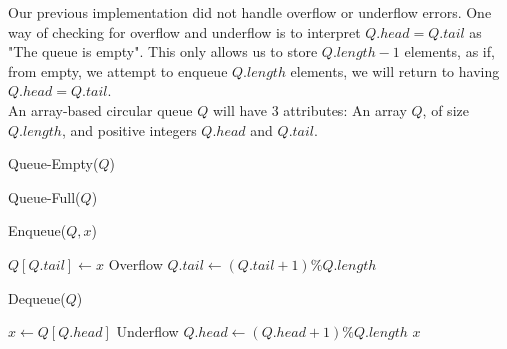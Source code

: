 \documentclass[11pt]{report}
\begin{document}
\begin{impl}
\begin{figure}[H]
    \end{figure}
\end{impl}
\pagebreak
\begin{impl}
    Our previous implementation did not handle overflow or underflow errors. One way of checking for overflow and underflow is to interpret $Q.head = Q.tail$ as "The queue is empty". This only allows us to store $Q.length - 1$ elements, as if, from empty, we attempt to enqueue $Q.length$ elements, we will return to having $Q.head = Q.tail$. \\ An array-based circular queue $Q$ will have 3 attributes: An array $Q$, of size $Q.length$, and positive integers $Q.head$ and $Q.tail$.\mypar
    \begin{algorithm}[H]
        \caption{Queue-Empty($Q$)}
    \end{algorithm}
    \begin{algorithm}[H]
        \caption{Queue-Full($Q$)}
    \end{algorithm}
    \begin{algorithm}[H]
        \caption{Enqueue($Q, x$)}
        $Q[Q.tail] \gets x$\;
        {
            \Error Overflow\;
        } 
        \Else
        {
            $Q.tail \gets (Q.tail + 1)\%Q.length$\;
        }
    \end{algorithm}
    \begin{algorithm}[H]
        \caption{Dequeue($Q$)}
        $x \gets Q[Q.head]$\;
        {
            \Error Underflow\;
        }
        \Else
        {
            $Q.head \gets (Q.head + 1)\%Q.length$\;
        }
        \Return $x$\;
    \end{algorithm}
\end{impl}
\end{document}
